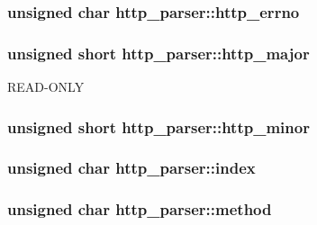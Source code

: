 \subsubsection[{http\+\_\+errno}]{\setlength{\rightskip}{0pt plus 5cm}unsigned char http\+\_\+parser\+::http\+\_\+errno}\label{structhttp__parser_a098a1fdf277d5dadaa8e52f17d81c5e5}
\hypertarget{structhttp__parser_ac994a4a8268652f5ce82de5bde5c3f9d}{}
\subsubsection[{http\+\_\+major}]{\setlength{\rightskip}{0pt plus 5cm}unsigned short http\+\_\+parser\+::http\+\_\+major}\label{structhttp__parser_ac994a4a8268652f5ce82de5bde5c3f9d}
R\+E\+A\+D-\/\+O\+N\+L\+Y \hypertarget{structhttp__parser_ae8af6433c824f5348773842db62ad4ab}{}
\subsubsection[{http\+\_\+minor}]{\setlength{\rightskip}{0pt plus 5cm}unsigned short http\+\_\+parser\+::http\+\_\+minor}\label{structhttp__parser_ae8af6433c824f5348773842db62ad4ab}
\hypertarget{structhttp__parser_ae1d04bd4da968b103e3ae91c8ee8b834}{}
\subsubsection[{index}]{\setlength{\rightskip}{0pt plus 5cm}unsigned char http\+\_\+parser\+::index}\label{structhttp__parser_ae1d04bd4da968b103e3ae91c8ee8b834}
\hypertarget{structhttp__parser_a28532af3774532c797ce32cbc128accd}{}
\subsubsection[{method}]{\setlength{\rightskip}{0pt plus 5cm}unsigned char http\+\_\+parser\+::method}\label{structhttp__parser_a28532af3774532c797ce32cbc128accd}
\hypertarget{structhttp__parser_a78085ca896bb3b9aa1ecb0f6fddc039d}{}
